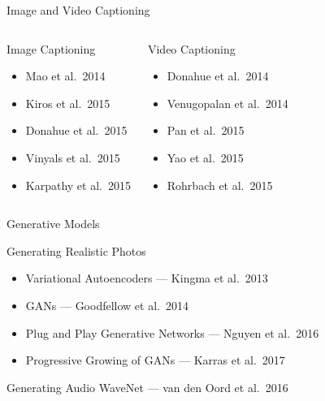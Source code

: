 \documentclass{beamer}
\begin{document}
\begin{frame}{Image and Video Captioning}

\begin{columns}


\begin{block}{Image Captioning}
\begin{itemize}
\item Mao et al.\ 2014
\item Kiros et al.\ 2015
\item Donahue et al.\ 2015
\item Vinyals et al.\ 2015
\item Karpathy et al.\ 2015
\end{itemize}
\end{block}


\begin{block}{Video Captioning}
\begin{itemize}
\item Donahue et al.\ 2014
\item Venugopalan et al.\ 2014
\item Pan et al.\ 2015
\item Yao et al.\ 2015
\item Rohrbach et al.\ 2015
\end{itemize}
\end{block}

\end{columns}

\end{frame}


\begin{frame}{Generative Models}

\begin{block}{Generating Realistic Photos}
\begin{itemize}
\item Variational Autoencoders --- Kingma et al.\ 2013
\item GANs --- Goodfellow et al.\ 2014
\item Plug and Play Generative Networks --- Nguyen et al.\ 2016
\item Progressive Growing of GANs --- Karras et al.\ 2017
\end{itemize}
\end{block}

\vspace{0.2cm}

\begin{block}{Generating Audio}
WaveNet --- van den Oord et al.\ 2016
\end{block}

\end{frame}
\end{document}
